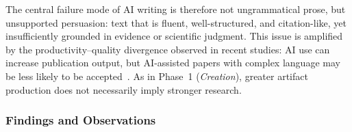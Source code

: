 The central failure mode of AI writing is therefore not ungrammatical prose, but unsupported persuasion: text that is fluent, well-structured, and citation-like, yet insufficiently grounded in evidence or scientific judgment. This issue is amplified by the productivity--quality divergence observed in recent studies: AI use can increase publication output, but AI-assisted papers with complex language may be less likely to be accepted~\cite{cornell2025science}. As in Phase~1 (\emph{Creation}), greater artifact production does not necessarily imply stronger research.



\subsubsection{Findings and Observations}
\label{sec:s5_findings}

